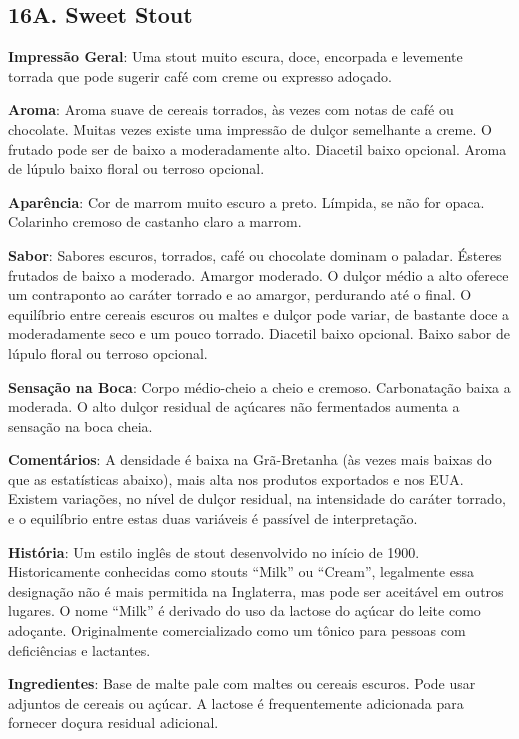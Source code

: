 \subsection*{16A. Sweet Stout}
\textbf{Impressão Geral}: Uma stout muito escura, doce, encorpada e levemente torrada que pode sugerir café com creme ou expresso adoçado.

\textbf{Aroma}: Aroma suave de cereais torrados, às vezes com notas de café ou chocolate. Muitas vezes existe uma impressão de dulçor semelhante a creme. O frutado pode ser de baixo a moderadamente alto. Diacetil baixo opcional. Aroma de lúpulo baixo floral ou terroso opcional.

\textbf{Aparência}: Cor de marrom muito escuro a preto. Límpida, se não for opaca. Colarinho cremoso de castanho claro a marrom.

\textbf{Sabor}: Sabores escuros, torrados, café ou chocolate dominam o paladar. Ésteres frutados de baixo a moderado. Amargor moderado. O dulçor médio a alto oferece um contraponto ao caráter torrado e ao amargor, perdurando até o final. O equilíbrio entre cereais escuros ou maltes e dulçor pode variar, de bastante doce a moderadamente seco e um pouco torrado. Diacetil baixo opcional. Baixo sabor de lúpulo floral ou terroso opcional.

\textbf{Sensação na Boca}: Corpo médio-cheio a cheio e cremoso. Carbonatação baixa a moderada. O alto dulçor residual de açúcares não fermentados aumenta a sensação na boca cheia.

\textbf{Comentários}: A densidade é baixa na Grã-Bretanha (às vezes mais baixas do que as estatísticas abaixo), mais alta nos produtos exportados e nos EUA. Existem variações, no nível de dulçor residual, na intensidade do caráter torrado, e o equilíbrio entre estas duas variáveis é passível de interpretação.

\textbf{História}: Um estilo inglês de stout desenvolvido no início de 1900. Historicamente conhecidas como stouts “Milk” ou “Cream”, legalmente essa designação não é mais permitida na Inglaterra, mas pode ser aceitável em outros lugares. O nome “Milk” é derivado do uso da lactose do açúcar do leite como adoçante. Originalmente comercializado como um tônico para pessoas com deficiências e lactantes.

\textbf{Ingredientes}: Base de malte pale com maltes ou cereais escuros. Pode usar adjuntos de cereais ou açúcar. A lactose é frequentemente adicionada para fornecer doçura residual adicional.

